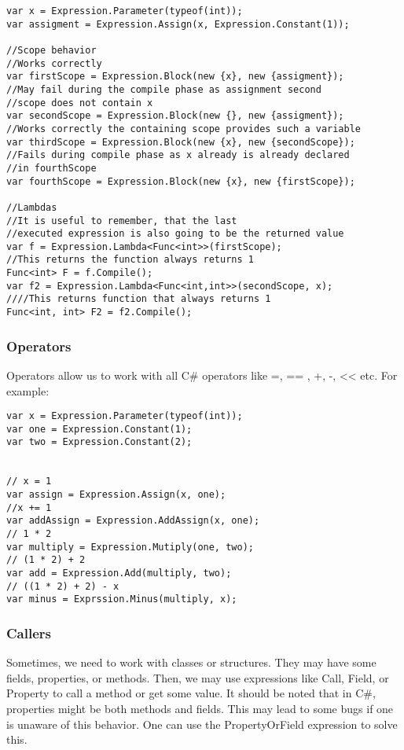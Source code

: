 \begin{lstlisting}
var x = Expression.Parameter(typeof(int));
var assigment = Expression.Assign(x, Expression.Constant(1));

//Scope behavior
//Works correctly
var firstScope = Expression.Block(new {x}, new {assigment});
//May fail during the compile phase as assignment second 
//scope does not contain x 
var secondScope = Expression.Block(new {}, new {assigment});
//Works correctly the containing scope provides such a variable
var thirdScope = Expression.Block(new {x}, new {secondScope});
//Fails during compile phase as x already is already declared
//in fourthScope
var fourthScope = Expression.Block(new {x}, new {firstScope});

//Lambdas
//It is useful to remember, that the last 
//executed expression is also going to be the returned value
var f = Expression.Lambda<Func<int>>(firstScope);
//This returns the function always returns 1 
Func<int> F = f.Compile();
var f2 = Expression.Lambda<Func<int,int>>(secondScope, x);
////This returns function that always returns 1 
Func<int, int> F2 = f2.Compile();
\end{lstlisting}

\subsubsection{Operators}
Operators allow us to work with all C\# operators like =, == , +, -, << etc. For example:
\begin{lstlisting}
var x = Expression.Parameter(typeof(int));
var one = Expression.Constant(1);
var two = Expression.Constant(2);


// x = 1
var assign = Expression.Assign(x, one);
//x += 1
var addAssign = Expression.AddAssign(x, one);
// 1 * 2
var multiply = Expression.Mutiply(one, two);
// (1 * 2) + 2
var add = Expression.Add(multiply, two);
// ((1 * 2) + 2) - x
var minus = Exprssion.Minus(multiply, x);
\end{lstlisting}
\subsubsection{Callers}
Sometimes, we need to work with classes or structures. They may have some fields, properties, or methods. Then, we may use expressions like Call, Field, or Property to call a method or get some value. It should be noted that in C\#, properties might be both methods and fields. This may lead to some bugs if one is unaware of this behavior. One can use the PropertyOrField expression to solve this.

